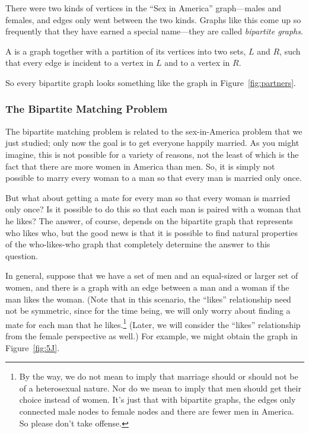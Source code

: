 There were two kinds of vertices in the ``Sex in America''
graph---males and females, and edges only went between the two kinds.
Graphs like this come up so frequently that they have earned a special
name---they are called \emph{bipartite graphs}.

\begin{definition}
A  is a graph together with a partition of its
vertices into two sets, $L$ and $R$, such that every edge is incident to a
vertex in $L$ and to a vertex in $R$.
\end{definition}

So every bipartite graph looks something like the graph in
Figure~\ref{fig:partners}.

\subsubsection{The Bipartite Matching Problem}

The bipartite matching problem is related to the sex-in-America
problem that we just studied; only now the goal is to get everyone
happily married.  As you might imagine, this is not possible for a
variety of reasons, not the least of which is the fact that there are
more women in America than men.  So, it is simply not possible to
marry every woman to a man so that every man is married only once.

But what about getting a mate for every man so that every woman is
married only once?  Is it possible to do this so that each man is
paired with a woman that he likes? The answer, of course, depends on
the bipartite graph that represents who likes who, but the good news
is that it is possible to find natural properties of the who-likes-who
graph that completely determine the answer to this question.

In general, suppose that we have a set of men and an equal-sized or
larger set of women, and there is a graph with an edge between a man
and a woman if the man likes the woman.  (Note that in this scenario,
the ``likes'' relationship need not be symmetric, since for the time
being, we will only worry about finding a mate for each man that he
likes.\footnote{By the way, we do not mean to imply that marriage
  should or should not be of a heterosexual nature.  Nor do we mean to
  imply that men should get their choice instead of women.  It's just
  that with bipartite graphs, the edges only connected male nodes to
  female nodes and there are fewer men in America.  So please don't
  take offense.}  (Later, we will consider the ``likes'' relationship
from the female perspective as well.)  For example, we might obtain
the graph in Figure~\ref{fig:5J}.

